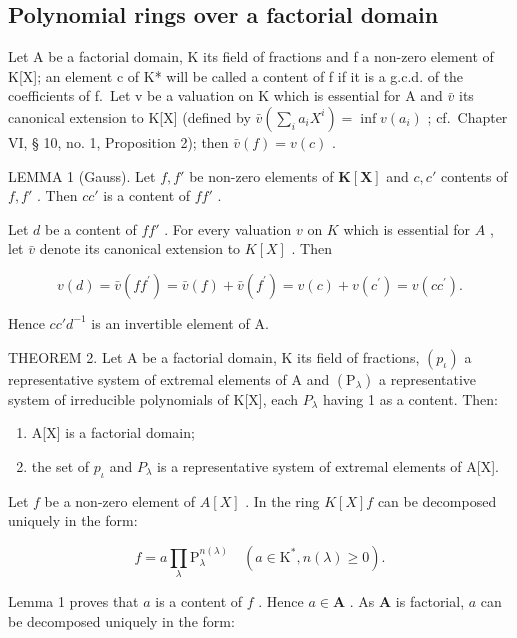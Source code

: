 \subsection{Polynomial rings over a factorial domain}

Let A be a factorial domain, K its field of fractions and f a non-zero element of K{[}X{]}; an element c of K* will be called a content of f if it is a g.c.d. of the coefficients of f.~Let v be a valuation on K which is essential for A and \(\bar{v}\) its canonical extension to K{[}X{]} (defined by \(\bar{v}\left(\sum_{i}a_{i}X^{i}\right)=\inf v(a_{i})\) ; cf.~Chapter VI, § 10, no. 1, Proposition 2); then \(\bar{v}(f)=v(c)\) .

LEMMA 1 (Gauss). Let \(f, f'\) be non-zero elements of \(\mathbf{K}[\mathbf{X}]\) and \(c, c'\) contents of \(f, f'\) . Then \(cc'\) is a content of \(ff'\) .

Let \(d\) be a content of \(ff'\) . For every valuation \(v\) on \(K\) which is essential for \(A\) , let \(\bar{v}\) denote its canonical extension to \(K[X]\) . Then

\[
v (d) = \bar {v} (f f ^ {\prime}) = \bar {v} (f) + \bar {v} (f ^ {\prime}) = v (c) + v (c ^ {\prime}) = v (c c ^ {\prime}).
\]

Hence \(cc'd^{-1}\) is an invertible element of A.

THEOREM 2. Let A be a factorial domain, K its field of fractions, \((p_{\iota})\) a representative system of extremal elements of A and \((\mathrm{P}_{\lambda})\) a representative system of irreducible polynomials of K{[}X{]}, each \(P_{\lambda}\) having 1 as a content. Then:

\begin{enumerate}
\def\labelenumi{(\roman{enumi})}
\item
  A{[}X{]} is a factorial domain;
\item
  the set of \(p_{\iota}\) and \(P_{\lambda}\) is a representative system of extremal elements of A{[}X{]}.
\end{enumerate}

Let \(f\) be a non-zero element of \(A[X]\) . In the ring \(K[X]f\) can be decomposed uniquely in the form:

\[
f = a \prod_ {\lambda} \mathrm{P} _ {\lambda} ^ {n (\lambda)} \quad (a \in \mathrm{K} ^ {*}, n (\lambda) \geqslant 0).
\]

Lemma 1 proves that \(a\) is a content of \(f\) . Hence \(a \in \mathbf{A}\) . As \(\mathbf{A}\) is factorial, \(a\) can be decomposed uniquely in the form:


